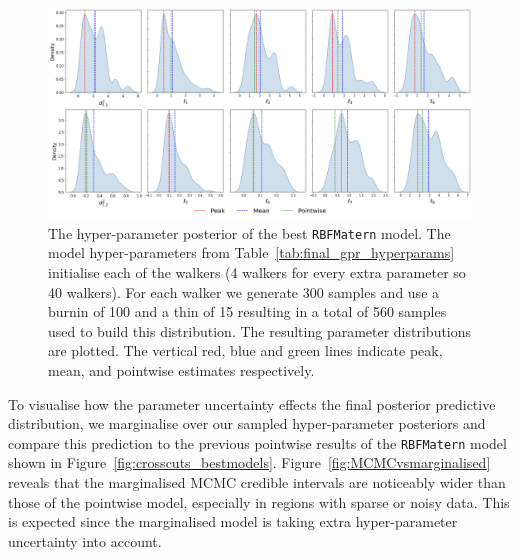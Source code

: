 \documentclass{ucdgradtaughtthesis}
\begin{document}
\begin{figure}[H]
    \centering
    \includegraphics[width=1\textwidth]{LatexPlots/final_gps_plots/MCMCRBFMat.png}
    \caption[The hyper-parameter posterior of the best \texttt{RBFMatern} model.]{The hyper-parameter posterior of the best \texttt{RBFMatern} model. The model hyper-parameters from Table~\ref{tab:final_gpr_hyperparams} initialise each of the walkers (4 walkers for every extra parameter so 40 walkers). For each walker we generate 300 samples and use a burnin of 100 and a thin of 15 resulting in a total of 560 samples used to build this distribution.
    The resulting parameter distributions are plotted. The vertical red, blue and green lines indicate peak, mean, and pointwise estimates respectively.}
    \label{fig:MCMCRBFMatern}
\end{figure}
To visualise how the parameter uncertainty effects the final posterior predictive distribution, we marginalise over our sampled hyper-parameter posteriors and compare this prediction to the previous pointwise results of the \texttt{RBFMatern} model shown in Figure~\ref{fig:crosscuts_bestmodels}.
Figure~\ref{fig:MCMCvsmarginalised} reveals that the marginalised MCMC credible intervals are noticeably wider than those of the pointwise model, especially in regions with sparse or noisy data. This is expected since the marginalised model is taking extra hyper-parameter
uncertainty into account. 
%
\end{document}

